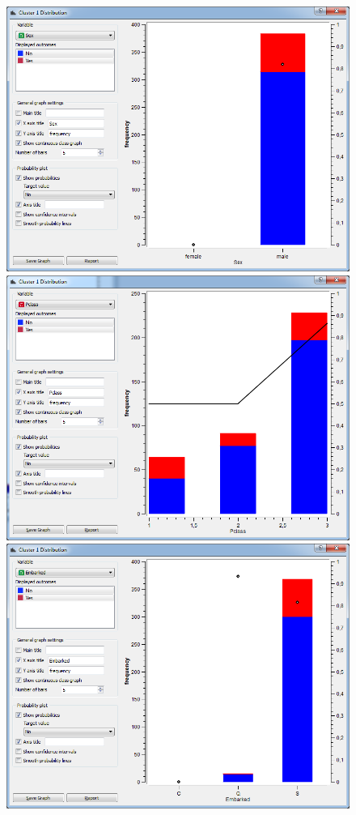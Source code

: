 \documentclass[a4paper,11pt]{article}
\begin{document}
\begin{figure}[h]
	\centering
	\begin{center}
		\includegraphics[scale=0.25]{ClusterDistribution/Cluster1/Sex}
		\includegraphics[scale=0.25]{ClusterDistribution/Cluster1/PClass}\\
		\vspace{1 mm}
		\includegraphics[scale=0.25]{ClusterDistribution/Cluster1/Embarked}

\end{center}
\end{figure}
\end{document}
